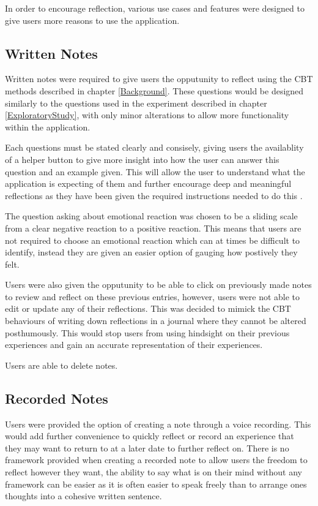 \documentclass{l4proj}
\begin{document}
In order to encourage reflection, various use cases and features were designed to give users more reasons to use the application.

\subsection{Written Notes}

Written notes were required to give users the opputunity to reflect using the CBT methods described in chapter \ref{Background}. These questions would be designed
similarly to the questions used in the experiment described in chapter \ref{ExploratoryStudy}, with only minor alterations to allow more functionality 
within the application. 

Each questions must be stated clearly and consisely, giving users the availablity of a helper button to give more insight into how the user can answer this
question and an example given. This will allow the user to understand what the application is expecting of them and further encourage deep and meaningful 
reflections as they have been given the required instructions needed to do this \citep{bruno_reflective_2018}. 

The question asking about emotional reaction was chosen to be a sliding scale from a clear negative reaction to a positive reaction. This means that 
users are not required to choose an emotional reaction which can at times be difficult to identify, instead they are given an easier option of 
gauging how postively they felt. 

Users were also given the opputunity to be able to click on previously made notes to review and reflect on these previous entries, however, users were not
able to edit or update any of their reflections. This was decided to mimick the CBT behaviours of writing down reflections in a journal where they cannot
be altered posthumously. This would stop users from using hindsight on their previous experiences and gain an accurate representation of their experiences.

Users are able to delete notes. 


\subsection{Recorded Notes}

Users were provided the option of creating a note through a voice recording. This would add further convenience to quickly reflect or record an experience
that they may want to return to at a later date to further reflect on. There is no framework provided when creating a recorded note to allow users the 
freedom to reflect however they want, the ability to say what is on their mind without any framework can be easier as it is often easier to speak freely than
to arrange ones thoughts into a cohesive written sentence. 
\end{document}
